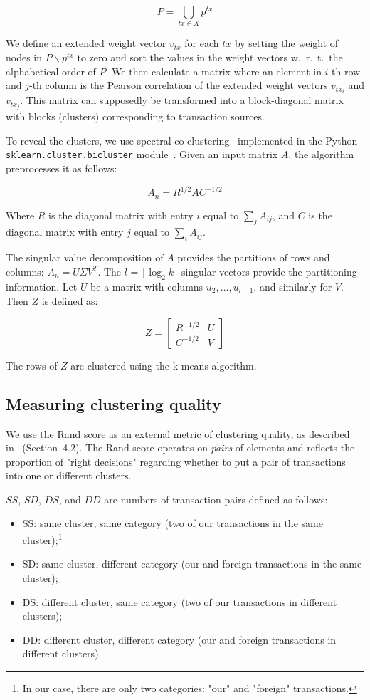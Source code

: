 \[
P = \bigcup\limits_{tx \in X} p^{tx}
\]

We define an extended weight vector $v_{tx}$ for each $tx$ by setting the weight of nodes in $P \backslash p^{tx}$ to zero and sort the values in the weight vectors w.~r.~t.~the alphabetical order of $P$.
We then calculate a matrix where an element in $i$-th row and $j$-th column is the Pearson correlation of the extended weight vectors $v_{tx_i}$ and $v_{tx_j}$.
This matrix can supposedly be transformed into a block-diagonal matrix with blocks (clusters) corresponding to transaction sources.

To reveal the clusters, we use spectral co-clustering~\cite{Dhillon2001} implemented in the Python \texttt{sklearn.cluster.bicluster} module~\cite{scikitlearn2018}.
Given an input matrix $A$, the algorithm preprocesses it as follows:

\[
A_n = R^{1/2}AC^{-1/2}
\]

Where $R$ is the diagonal matrix with entry $i$ equal to $\sum_{j} A_{ij}$, and $C$ is the diagonal matrix with entry $j$ equal to $\sum_{i} A_{ij}$.

The singular value decomposition of $A$ provides the partitions of rows and columns: $A_{n}=U \Sigma V^{T}$.
The $l$ = $\lceil \log_2 k \rceil$ singular vectors provide the partitioning information.
Let $U$ be a matrix with columns $u_2,\dots,u_{l+1}$, and similarly for $V$.
Then $Z$ is defined as:

\[
Z = 
\begin{bmatrix}
R^{-1/2} & U \\
C^{-1/2} & V
\end{bmatrix}
\]

The rows of $Z$ are clustered using the k-means algorithm.


\subsection{Measuring clustering quality}

We use the Rand score as an external metric of clustering quality, as described in~\cite{Amigo2009} (Section~4.2).
The Rand score operates on \textit{pairs} of elements and reflects the proportion of "right decisions" regarding whether to put a pair of transactions into one or different clusters.

$SS$, $SD$, $DS$, and $DD$ are numbers of transaction pairs defined as follows:
\begin{itemize}
	\item SS: same cluster, same category (two of our transactions in the same cluster);\footnote{In our case, there are only two categories: "our" and "foreign" transactions.}
	\item SD: same cluster, different category (our and foreign transactions in the same cluster);
	\item DS: different cluster, same category (two of our transactions in different clusters);
	\item DD: different cluster, different category (our and foreign transactions in different clusters).
\end{itemize}

